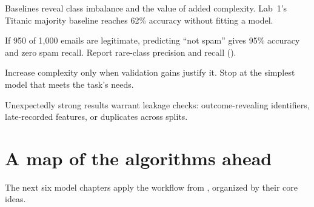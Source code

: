 Baselines reveal class imbalance and the value of added complexity. Lab~1's Titanic majority baseline reaches 62\% accuracy without fitting a model.

\begin{workedexample}
If 950 of 1,000 emails are legitimate, predicting ``not spam'' gives 95\% accuracy and zero spam recall. Report rare-class precision and recall ().
\end{workedexample}

\begin{mlfigure}
\end{mlfigure}

\begin{analogy}
Increase complexity only when validation gains justify it. Stop at the simplest model that meets the task's needs.
\end{analogy}

\begin{pitfall}
Unexpectedly strong results warrant leakage checks: outcome-revealing identifiers, late-recorded features, or duplicates across splits.
\end{pitfall}

\section{A map of the algorithms ahead}

The next six model chapters apply the workflow from , organized by their core ideas.

